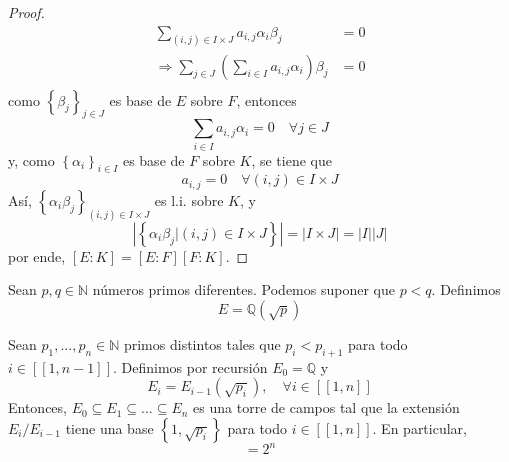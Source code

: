 \documentclass[12pt]{report}
\theoremstyle{largebreak}
\newcommand\abs[1]{\ensuremath{\left|#1\right|}}
\newcommand\natint[1]{\ensuremath{\left[\!\left[ #1\right]\!\right]}}
\begin{document}
\begin{proof}
\begin{equation*}
            \begin{split}
                \sum_{ (i,j)\in I\times J}a_{ i,j}\alpha_i\beta_j&=0\\
                \Rightarrow \sum_{j\in J}\left(\sum_{i\in I}a_{ i,j}\alpha_i\right)\beta_j&=0\\
            \end{split}
        \end{equation*}
        como $\left\{\beta_j \right\}_{ j\in J}$ es base de $E$ sobre $F$, entonces
        \begin{equation*}
            \sum_{i\in I}a_{ i,j}\alpha_i=0\quad\forall j\in J
        \end{equation*}
        y, como $\left\{\alpha_i \right\}_{ i\in I}$ es base de $F$ sobre $K$, se tiene que
        \begin{equation*}
            a_{ i,j}=0\quad\forall (i,j)\in I\times J
        \end{equation*}
        Así, $\left\{\alpha_i\beta_j \right\}_{ (i,j)\in I\times J}$ es l.i. sobre $K$, y
        \begin{equation*}
            \abs{\left\{\alpha_i\beta_j\Big|(i,j)\in I\times J\right\}}=\abs{I\times J}=\abs{I}\abs{J}
        \end{equation*}
        por ende, $[E:K]=[E:F][F:K]$.
    \end{proof}

    \begin{exa}
        Sean $p,q\in\mathbb{N}$ números primos diferentes. Podemos suponer que $p<q$. Definimos
        \begin{equation*}
            E=\mathbb{Q}(\sqrt{p})
        \end{equation*}
    \end{exa}

    \begin{propo}
        Sean $p_1,...,p_n\in\mathbb{N}$ primos distintos tales que $p_i<p_{ i+1}$ para todo $i\in\natint{1,n-1}$. Definimos por recursión $E_0=\mathbb{Q}$ y
        \begin{equation*}
            E_i=E_{ i-1}(\sqrt{p_i}),\quad\forall i\in\natint{1,n}
        \end{equation*}
        Entonces, $E_0\subseteq E_1\subseteq ... \subseteq E_n$ es una torre de campos tal que la extensión $E_i/E_{ i-1}$ tiene una base $\left\{1,\sqrt{p_i} \right\}$ para todo $i\in\natint{1,n}$. En particular,
        \begin{equation*}
            [E_n:E_0]=2^n
        \end{equation*}
    \end{propo}
\end{document}

